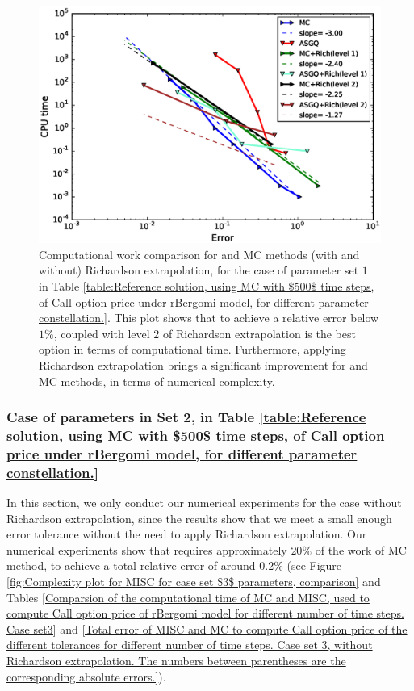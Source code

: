 \begin{figure}[h!]
	\centering
	\includegraphics[width=0.6\linewidth]{./figures/rBergomi_Complexity_rates/set2/error_vs_time_set2_full_comparison}
	
	\caption{Computational work comparison for  and MC methods (with and without) Richardson extrapolation, for the case of parameter set $1$ in Table \ref{table:Reference solution, using MC with $500$ time steps, of Call option price under rBergomi model, for different parameter constellation.}. This plot shows that to achieve a relative error below $1\%$,  coupled with level $2$ of Richardson extrapolation is the best option in terms of computational time. Furthermore, applying Richardson extrapolation brings a significant improvement for  and MC methods, in terms of numerical complexity.}
	\label{fig:Complexity plot for  MISC for Case set $2$ parameters, comparison}
\end{figure}




\FloatBarrier

\subsubsection{Case of parameters in Set 2, in Table \ref{table:Reference solution, using MC with $500$ time steps, of Call option price under rBergomi model, for different parameter constellation.} }\label{sec:Case of set 3 parameters}

In this section, we only conduct our numerical experiments for the case without Richardson extrapolation, since the results show that we meet a small enough error tolerance without the need to apply   Richardson extrapolation. Our numerical experiments show that  requires  approximately $20\%$ of the work of MC method, to achieve  a total relative error of around $0.2\%$ (see Figure \ref{fig:Complexity plot for  MISC for case set $3$ parameters, comparison} and  Tables \ref{Comparsion of the computational time of  MC and MISC, used to compute Call option price of rBergomi model for different number of time steps. Case set3} and \ref{Total error of MISC and MC to compute Call option price of the different tolerances for different number of time steps. Case set 3, without Richardson extrapolation. The numbers between parentheses are the corresponding absolute errors.}).  

